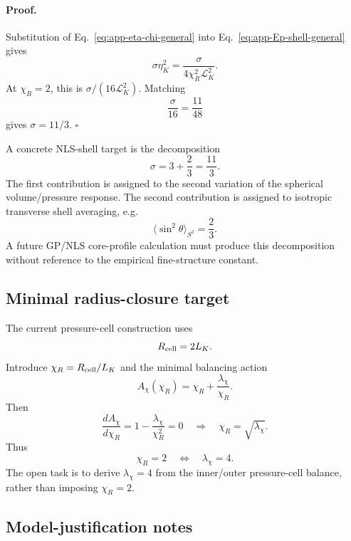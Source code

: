 \documentclass[11pt]{article}
\begin{document}
\paragraph{Proof.}
Substitution of Eq.~\eqref{eq:app-eta-chi-general} into
Eq.~\eqref{eq:app-Ep-shell-general} gives
\[
  \sigma\eta_K^2
  =
  \frac{\sigma}{4\chi_R^2\mathcal L_K^2}.
\]
At \(\chi_R=2\), this is \(\sigma/(16\mathcal L_K^2)\).  Matching
\[
  \frac{\sigma}{16}
  =
  \frac{11}{48}
\]
gives \(\sigma=11/3\). \(\square\)

A concrete NLS-shell target is the decomposition
\begin{equation}
  \sigma
  =
  3+\frac{2}{3}
  =
  \frac{11}{3}.
  \label{eq:app-sigma-decomposition}
\end{equation}
The first contribution is assigned to the second variation of the spherical
volume/pressure response.  The second contribution is assigned to isotropic
transverse shell averaging, e.g.
\[
  \langle \sin^2\theta\rangle_{S^2}=\frac{2}{3}.
\]
A future GP/NLS core-profile calculation must produce this decomposition
without reference to the empirical fine-structure constant.

\subsection{Minimal radius-closure target}

The current pressure-cell construction uses
\[
  R_{\rm cell}=2L_K.
\]
Introduce \(\chi_R=R_{\rm cell}/L_K\) and the minimal balancing action
\begin{equation}
  A_\chi(\chi_R)
  =
  \chi_R+\frac{\lambda_\chi}{\chi_R}.
  \label{eq:app-Achi-minimal}
\end{equation}
Then
\begin{equation}
  \frac{dA_\chi}{d\chi_R}
  =
  1-\frac{\lambda_\chi}{\chi_R^2}=0
  \quad\Longrightarrow\quad
  \chi_R=\sqrt{\lambda_\chi}.
\end{equation}
Thus
\begin{equation}
  \chi_R=2
  \quad\Longleftrightarrow\quad
  \lambda_\chi=4.
  \label{eq:app-chi-target}
\end{equation}
The open task is to derive \(\lambda_\chi=4\) from the inner/outer
pressure-cell balance, rather than imposing \(\chi_R=2\).


\subsection{Model-justification notes}
\end{document}
